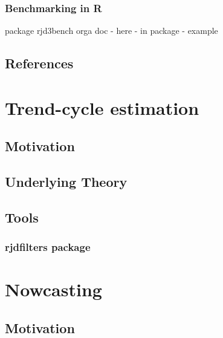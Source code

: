 \documentclass[
  letterpaper,
  DIV=11,
  numbers=noendperiod]{scrreprt}
\begin{document}
\hypertarget{benchmarking-in-r}{%
\subsection{Benchmarking in R}\label{benchmarking-in-r}}

package rjd3bench orga doc - here - in package - example

\hypertarget{references}{%
\section{References}\label{references}}

\hypertarget{trend-cycle-estimation-1}{%
\chapter{Trend-cycle estimation}\label{trend-cycle-estimation-1}}

\hypertarget{motivation-3}{%
\section{Motivation}\label{motivation-3}}

\hypertarget{underlying-theory-1}{%
\section{Underlying Theory}\label{underlying-theory-1}}

\hypertarget{tools-5}{%
\section{Tools}\label{tools-5}}

\hypertarget{rjdfilters-package}{%
\subsection{rjdfilters package}\label{rjdfilters-package}}

\hypertarget{nowcasting}{%
\chapter{Nowcasting}\label{nowcasting}}

\hypertarget{motivation-4}{%
\section{Motivation}\label{motivation-4}}
\end{document}
